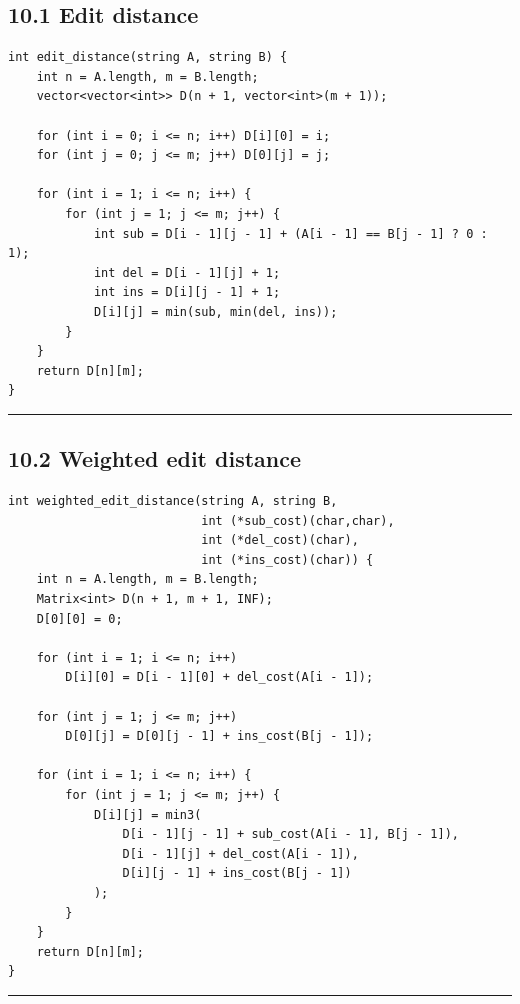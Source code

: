 \documentclass[11pt]{article}
\begin{document}
\subsection{10.1 Edit distance}\label{edit-distance}

\begin{verbatim}
int edit_distance(string A, string B) {
    int n = A.length, m = B.length;
    vector<vector<int>> D(n + 1, vector<int>(m + 1));

    for (int i = 0; i <= n; i++) D[i][0] = i;
    for (int j = 0; j <= m; j++) D[0][j] = j;

    for (int i = 1; i <= n; i++) {
        for (int j = 1; j <= m; j++) {
            int sub = D[i - 1][j - 1] + (A[i - 1] == B[j - 1] ? 0 : 1);
            int del = D[i - 1][j] + 1;
            int ins = D[i][j - 1] + 1;
            D[i][j] = min(sub, min(del, ins));
        }
    }
    return D[n][m];
}
\end{verbatim}

\begin{center}\rule{0.5\linewidth}{0.5pt}\end{center}

\subsection{10.2 Weighted edit distance}\label{weighted-edit-distance}

\begin{verbatim}
int weighted_edit_distance(string A, string B,
                           int (*sub_cost)(char,char),
                           int (*del_cost)(char),
                           int (*ins_cost)(char)) {
    int n = A.length, m = B.length;
    Matrix<int> D(n + 1, m + 1, INF);
    D[0][0] = 0;

    for (int i = 1; i <= n; i++)
        D[i][0] = D[i - 1][0] + del_cost(A[i - 1]);

    for (int j = 1; j <= m; j++)
        D[0][j] = D[0][j - 1] + ins_cost(B[j - 1]);

    for (int i = 1; i <= n; i++) {
        for (int j = 1; j <= m; j++) {
            D[i][j] = min3(
                D[i - 1][j - 1] + sub_cost(A[i - 1], B[j - 1]),
                D[i - 1][j] + del_cost(A[i - 1]),
                D[i][j - 1] + ins_cost(B[j - 1])
            );
        }
    }
    return D[n][m];
}
\end{verbatim}

\begin{center}\rule{0.5\linewidth}{0.5pt}\end{center}
\end{document}
